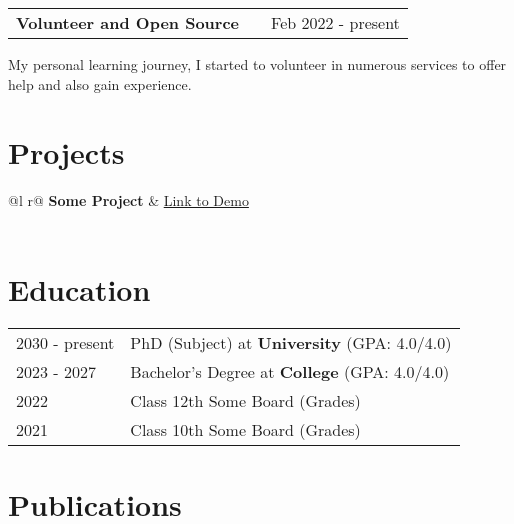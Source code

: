 \documentclass[a4paper,12pt]{article}
\makeatletter
\newenvironment{jobshort}[2]
    {
    \begin{tabularx}{\linewidth}{@{}l X r@{}}
    \textbf{#1} & \hfill &  #2 \\[3.75pt]
    \end{tabularx}
    }
    {
    }
\makeatother
\begin{document}
\begin{jobshort}{Volunteer and Open Source}{Feb 2022 - present}
\After My personal learning journey, I started to volunteer in numerous services to offer help and also gain experience. 
\end{jobshort}

\section{Projects}

\begin{tabularx}{\linewidth}{ @{}l r@{} }
\textbf{Some Project} & \hfill \href{https://some-link.com}{Link to Demo} \\[3.75pt]
  \\
\end{tabularx}

\section{Education}
\begin{tabularx}{\linewidth}{@{}l X@{}}	
2030 - present & PhD (Subject) at \textbf{University} \hfill \normalsize (GPA: 4.0/4.0) \\

2023 - 2027 & Bachelor's Degree at \textbf{College} \hfill (GPA: 4.0/4.0) \\ 

2022 & Class 12th Some Board \hfill  (Grades) \\

2021 & Class 10th Some Board \hfill  (Grades) \\
\end{tabularx}

\section{Publications}
\begin{refsection}
\nocite{*}
\printbibliography[heading=none]
\end{refsection}
\end{document}
